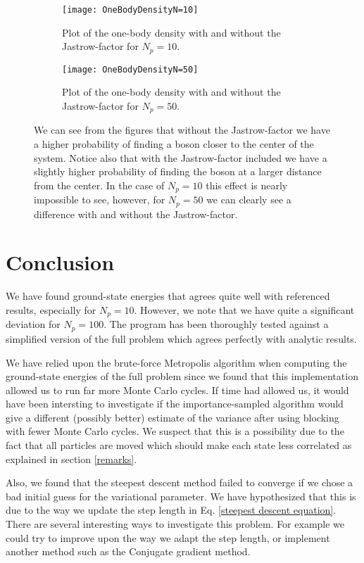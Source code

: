 \documentclass[a4paper,10pt]{article}
\begin{document}
\begin{figure}[h!]
 \centering
 \begin{subfigure}[b]{0.48\textwidth}
  \texttt{[image: OneBodyDensityN=10]}
  \caption{Plot of the one-body density with and without the Jastrow-factor for $N_p = 10$.}
 \end{subfigure}
 \begin{subfigure}[b]{0.48\textwidth}
  \texttt{[image: OneBodyDensityN=50]}
  \caption{Plot of the one-body density with and without the Jastrow-factor for $N_p = 50$.}
 \end{subfigure}
 \caption{We can see from the figures that without the Jastrow-factor we have a higher probability of finding a boson closer to the center of the system. 
 Notice also that with the Jastrow-factor included we have a slightly higher probability of finding the boson at a larger distance from the center. In the
 case of $N_p = 10$ this effect is nearly impossible to see, however, for $N_p = 50$ we can clearly see a difference with and without the Jastrow-factor.}
 \label{One Body densities figure}
\end{figure}

\section{Conclusion}
We have found ground-state energies that agrees quite well with referenced results, especially for $N_p=10$. However, we note that we have 
quite a significant deviation for $N_p=100$. The program has been thoroughly tested against a simplified version of the full problem which agrees 
perfectly with analytic results. 

We have relied upon the brute-force Metropolis algorithm when computing the ground-state energies of the full problem since we found that this implementation
allowed us to run far more Monte Carlo cycles. If time had allowed us, it would have been intersting to investigate if 
the importance-sampled algorithm would give a different (possibly better) estimate of the variance after using blocking with fewer Monte Carlo cycles. We suspect that this 
is a possibility due to the fact that all particles are moved which should make each state less correlated as explained in section \ref{remarks}. 

Also, we found that the steepest descent method failed to converge if we chose a bad initial guess for the variational parameter. We have hypothesized
that this is due to the way we update the step length in Eq. \ref{steepest descent equation}. There are several interesting ways to investigate this problem.
For example we could try to improve upon the way we adapt the step length, or implement another method such as the Conjugate gradient method.
\end{document}
